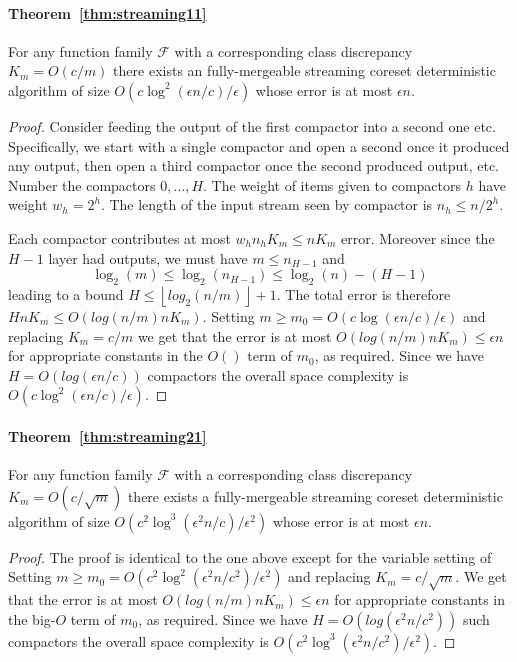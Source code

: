 \documentclass[anon,12pt]{colt2019} %
\newcommand{\eps}{\epsilon}
\newcommand{\F}{\mathcal{F}}
\newcommand{\floor}[1]{\left \lfloor #1 \right \rfloor}
\begin{document}
\paragraph{Theorem~\ref{thm:streaming11}}
For any function family $\F$ with a corresponding class discrepancy $K_m = O(c/m)$ there exists an fully-mergeable streaming coreset deterministic algorithm of size $O\left(c\log^2(\eps n/c)/\eps\right)$ whose error is at most $\eps n$.
\begin{proof}
Consider feeding the output of the first compactor into a second one etc. Specifically, we start with a single compactor and open a second once it produced any output, then open a third compactor once the second produced output, etc.
Number the compactors $0,\ldots,H$. The weight of items given to compactors $h$ have weight $w_h = 2^h$. The length of the input stream seen by compactor is $n_h \le n/2^h$.

Each compactor contributes at most $w_h n_h K_m \le n K_m$ error. Moreover since the $H-1$ layer had outputs, we must have $m \leq n_{H-1}$ and
$$  \log_2(m) \leq \log_2(n_{H-1}) \leq \log_2(n) - (H-1)$$
leading to a bound $H \le \floor{log_2(n/m)}+1$.
The total error is therefore $H n K_m \le O(log(n/m) n K_m)$. 
Setting $m \ge m_0 = O(c\log(\eps n/c)/\eps)$ and replacing $K_m = c/m$ we get that the error is at most $O(log(n/m) n K_m) \le \eps n$ for appropriate constants in the $O()$ term of $m_0$, as required. 
Since we have $H = O(log(\eps n/c))$ compactors the overall space complexity is $O(c\log^2(\eps n/c)/\eps)$. 
\end{proof}

\paragraph{Theorem~\ref{thm:streaming21}}
For any function family $\F$ with a corresponding class discrepancy $K_m = O(c/\sqrt{m})$ there exists a fully-mergeable streaming coreset deterministic algorithm of size $O\left(c^2\log^3(\eps^2 n/c) /\eps^2\right)$ whose error is at most $\eps n$. 
\begin{proof}
The proof is identical to the one above except for the variable setting of
Setting $m \ge m_0 = O(c^2\log^2(\eps^2 n/c^2)/\eps^2)$ and replacing $K_m = c/\sqrt{m}$. 
We get that the error is at most $O(log(n/m) n K_m) \le \eps n$ for appropriate constants in the big-$O$ term of $m_0$, as required. 
Since we have $H = O(log(\eps^2 n/c^2))$ such compactors the overall space complexity is $O\left(c^2\log^3(\eps^2 n/c^2) /\eps^2\right)$. 
\end{proof}
\end{document}
